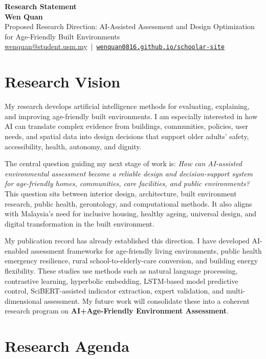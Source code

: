 \documentclass[11pt,a4paper]{article}
\begin{document}
{\LARGE \textbf{Research Statement}}\\[-1pt]
\textbf{Wen Quan}\\
\textcolor{subtle}{Proposed Research Direction: AI-Assisted Assessment and Design Optimization for Age-Friendly Built Environments}\\
\href{mailto:wenquan@student.usm.my}{wenquan@student.usm.my} \,|\, 
\href{https://wenquan0816.github.io/schoolar-site/}{\nolinkurl{wenquan0816.github.io/schoolar-site}}

\section*{Research Vision}
My research develops artificial intelligence methods for evaluating, explaining, and improving age-friendly built environments. I am especially interested in how AI can translate complex evidence from buildings, communities, policies, user needs, and spatial data into design decisions that support older adults' safety, accessibility, health, autonomy, and dignity.

The central question guiding my next stage of work is: \textit{How can AI-assisted environmental assessment become a reliable design and decision-support system for age-friendly homes, communities, care facilities, and public environments?} This question sits between interior design, architecture, built environment research, public health, gerontology, and computational methods. It also aligns with Malaysia's need for inclusive housing, healthy ageing, universal design, and digital transformation in the built environment.

My publication record has already established this direction. I have developed AI-enabled assessment frameworks for age-friendly living environments, public health emergency resilience, rural school-to-elderly-care conversion, and building energy flexibility. These studies use methods such as natural language processing, contrastive learning, hyperbolic embedding, LSTM-based model predictive control, SciBERT-assisted indicator extraction, expert validation, and multi-dimensional assessment. My future work will consolidate these into a coherent research program on \textbf{AI+Age-Friendly Environment Assessment}.

\section*{Research Agenda}
\end{document}

